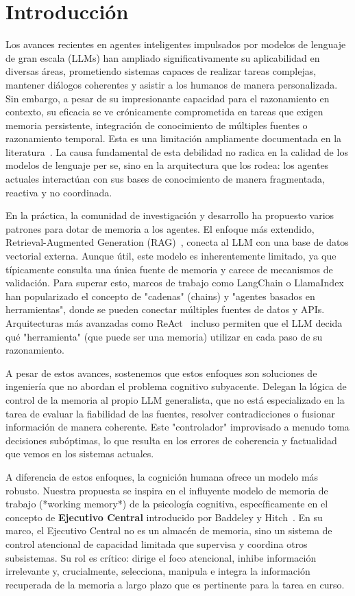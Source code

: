 \documentclass[conference]{IEEEtran}
\begin{document}
\section{Introducción}

Los avances recientes en agentes inteligentes impulsados por modelos de lenguaje de gran escala (LLMs) han ampliado significativamente su aplicabilidad en diversas áreas, prometiendo sistemas capaces de realizar tareas complejas, mantener diálogos coherentes y asistir a los humanos de manera personalizada. Sin embargo, a pesar de su impresionante capacidad para el razonamiento en contexto, su eficacia se ve crónicamente comprometida en tareas que exigen memoria persistente, integración de conocimiento de múltiples fuentes o razonamiento temporal. Esta es una limitación ampliamente documentada en la literatura~\cite{zhang2024survey}. La causa fundamental de esta debilidad no radica en la calidad de los modelos de lenguaje per se, sino en la arquitectura que los rodea: los agentes actuales interactúan con sus bases de conocimiento de manera fragmentada, reactiva y no coordinada.

En la práctica, la comunidad de investigación y desarrollo ha propuesto varios patrones para dotar de memoria a los agentes. El enfoque más extendido, Retrieval-Augmented Generation (RAG)~\cite{lewis2020retrieval}, conecta al LLM con una base de datos vectorial externa. Aunque útil, este modelo es inherentemente limitado, ya que típicamente consulta una única fuente de memoria y carece de mecanismos de validación. Para superar esto, marcos de trabajo como LangChain o LlamaIndex han popularizado el concepto de "cadenas" (chains) y "agentes basados en herramientas", donde se pueden conectar múltiples fuentes de datos y APIs. Arquitecturas más avanzadas como ReAct~\cite{yao2022react} incluso permiten que el LLM decida qué "herramienta" (que puede ser una memoria) utilizar en cada paso de su razonamiento.

A pesar de estos avances, sostenemos que estos enfoques son soluciones de ingeniería que no abordan el problema cognitivo subyacente. Delegan la lógica de control de la memoria al propio LLM generalista, que no está especializado en la tarea de evaluar la fiabilidad de las fuentes, resolver contradicciones o fusionar información de manera coherente. Este "controlador" improvisado a menudo toma decisiones subóptimas, lo que resulta en los errores de coherencia y factualidad que vemos en los sistemas actuales.

A diferencia de estos enfoques, la cognición humana ofrece un modelo más robusto. Nuestra propuesta se inspira en el influyente modelo de memoria de trabajo (*working memory*) de la psicología cognitiva, específicamente en el concepto de \textbf{Ejecutivo Central} introducido por Baddeley y Hitch~\cite{baddeley1974working}. En su marco, el Ejecutivo Central no es un almacén de memoria, sino un sistema de control atencional de capacidad limitada que supervisa y coordina otros subsistemas. Su rol es crítico: dirige el foco atencional, inhibe información irrelevante y, crucialmente, selecciona, manipula e integra la información recuperada de la memoria a largo plazo que es pertinente para la tarea en curso.
\end{document}
